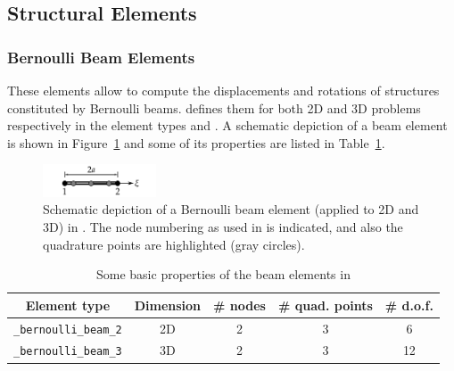\subsection{Structural Elements}

\subsubsection*{Bernoulli Beam Elements}
These elements allow to compute the displacements and rotations of
structures constituted by Bernoulli beams. \akantu defines them for
both 2D and 3D problems respectively in the element types
 and . A
schematic depiction of a beam element is shown in
Figure~\ref{fig:elements:bernoulli} and some of its properties are
listed in Table~\ref{tab:elements:bernoulli}.


\begin{figure}[htb]
  \centering
  \includegraphics[width=0.3\textwidth]{figures/elements/bernoulli_2}
  \caption{Schematic depiction of a Bernoulli beam element (applied to
    2D and 3D) in \akantu. The node numbering as used in \akantu is
    indicated, and also the quadrature points are highlighted (gray
    circles).}
  \label{fig:elements:bernoulli}
\end{figure}
\begin{table}[htb]
  \centering
  \begin{tabular}{c|cccc}
    \toprule
    Element type                  & Dimension & \# nodes &\# quad. points & \# d.o.f.\\
    \midrule
    \texttt{\_bernoulli\_beam\_2} &         2D&         2&              3&  6\\
    \texttt{\_bernoulli\_beam\_3} &         3D&         2&              3&  12\\
    \bottomrule
  \end{tabular}
  \caption{Some basic properties of the beam elements in \akantu}
  \label{tab:elements:bernoulli}
\end{table}
